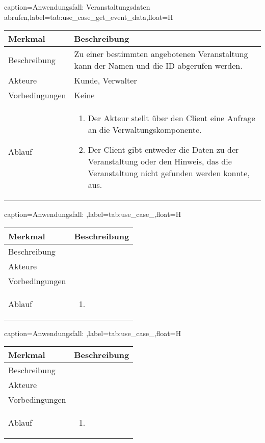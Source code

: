 \begin{dhbwtable}{caption={Anwendungsfall: Veranstaltungsdaten abrufen},label=tab:use_case_get_event_data,float=H}
    \begin{tabularx}{\textwidth}{lX}
        \toprule
        \textbf{Merkmal} & \textbf{Beschreibung}  \\ \midrule
        Beschreibung    & Zu einer bestimmten angebotenen Veranstaltung kann der Namen und die ID abgerufen werden. \\
        Akteure         & Kunde, Verwalter \\
        Vorbedingungen  & Keine \\
        Ablauf          & \begin{enumerate}
            \item Der Akteur stellt über den Client eine Anfrage an die Verwaltungskomponente.
            \item Der Client gibt entweder die Daten zu der Veranstaltung oder den Hinweis, das die Veranstaltung nicht gefunden werden konnte, aus.
        \end{enumerate} \\\bottomrule
    \end{tabularx}    
\end{dhbwtable}

\begin{dhbwtable}{caption={Anwendungsfall: },label=tab:use_case_,float=H}
    \begin{tabularx}{\textwidth}{lX}
        \toprule
        \textbf{Merkmal} & \textbf{Beschreibung}  \\ \midrule
        Beschreibung    &  \\
        Akteure         &  \\
        Vorbedingungen  &  \\
        Ablauf          & \begin{enumerate}
            \item 
        \end{enumerate} \\\bottomrule
    \end{tabularx}    
\end{dhbwtable}

\begin{dhbwtable}{caption={Anwendungsfall: },label=tab:use_case_,float=H}
    \begin{tabularx}{\textwidth}{lX}
        \toprule
        \textbf{Merkmal} & \textbf{Beschreibung}  \\ \midrule
        Beschreibung    &  \\
        Akteure         &  \\
        Vorbedingungen  &  \\
        Ablauf          & \begin{enumerate}
            \item 
        \end{enumerate} \\\bottomrule
    \end{tabularx}    
\end{dhbwtable}

